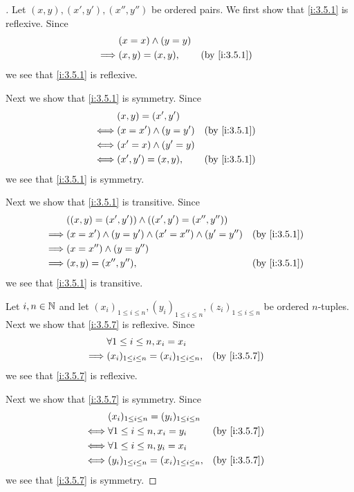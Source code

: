 \begin{proof}[]
  Let \((x, y), (x', y'), (x'', y'')\) be ordered pairs.
  We first show that \cref{i:3.5.1} is reflexive.
  Since
  \begin{align*}
             & (x = x) \land (y = y)                   \\
    \implies & (x, y) = (x, y),      &  & \by{i:3.5.1}
  \end{align*}
  we see that \cref{i:3.5.1} is reflexive.

  Next we show that \cref{i:3.5.1} is symmetry.
  Since
  \begin{align*}
         & (x, y) = (x', y')                         \\
    \iff & (x = x') \land (y = y') &  & \by{i:3.5.1} \\
    \iff & (x' = x) \land (y' = y)                   \\
    \iff & (x', y') = (x, y),      &  & \by{i:3.5.1}
  \end{align*}
  we see that \cref{i:3.5.1} is symmetry.

  Next we show that \cref{i:3.5.1} is transitive.
  Since
  \begin{align*}
             & ((x, y) = (x', y')) \land ((x', y') = (x'', y''))                           \\
    \implies & (x = x') \land (y = y') \land (x' = x'') \land (y' = y'') &  & \by{i:3.5.1} \\
    \implies & (x = x'') \land (y = y'')                                                   \\
    \implies & (x, y) = (x'', y''),                                      &  & \by{i:3.5.1}
  \end{align*}
  we see that \cref{i:3.5.1} is transitive.

  Let \(i, n \in \mathbb{N}\) and let \((x_i)_{1 \leq i \leq n}, (y_i)_{1 \leq i \leq n}, (z_i)_{1 \leq i \leq n}\) be ordered \(n\)-tuples.
  Next we show that \cref{i:3.5.7} is reflexive.
  Since
  \begin{align*}
             & \forall 1 \leq i \leq n, x_i = x_i                                   \\
    \implies & (x_i)_{1 \leq i \leq n} = (x_i)_{1 \leq i \leq n}, &  & \by{i:3.5.7}
  \end{align*}
  we see that \cref{i:3.5.7} is reflexive.

  Next we show that \cref{i:3.5.7} is symmetry.
  Since
  \begin{align*}
         & (x_i)_{1 \leq i \leq n} = (y_i)_{1 \leq i \leq n}                    \\
    \iff & \forall 1 \leq i \leq n, x_i = y_i                 &  & \by{i:3.5.7} \\
    \iff & \forall 1 \leq i \leq n, y_i = x_i                                   \\
    \iff & (y_i)_{1 \leq i \leq n} = (x_i)_{1 \leq i \leq n}, &  & \by{i:3.5.7}
  \end{align*}
  we see that \cref{i:3.5.7} is symmetry.


\end{proof}
